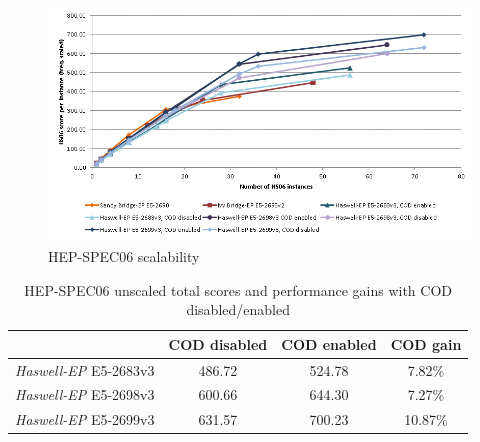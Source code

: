 \documentclass[a4paper]{jpconf}
\begin{document}
\begin{figure}
\centering
  \includegraphics[width=\textwidth]{hs06_absolute}
  \caption{HEP-SPEC06 scalability}
  \label{fig:hs06_absolute}
\end{figure}
\begin{table}[h]
\centering
\begin{tabular}{@{}cccc@{}}
\toprule
& COD disabled & COD enabled & COD gain \\
\midrule
\textit{Haswell-EP} E5-2683v3 & 486.72 & 524.78 & 7.82\%\\
\textit{Haswell-EP} E5-2698v3 & 600.66 & 644.30 & 7.27\%\\
\textit{Haswell-EP} E5-2699v3 & 631.57 & 700.23 & 10.87\%\\
\bottomrule
\end{tabular}
\caption{HEP-SPEC06 unscaled total scores and performance gains with COD disabled/enabled}
\label{tab:hs06_cod}
\end{table}

\end{document}
